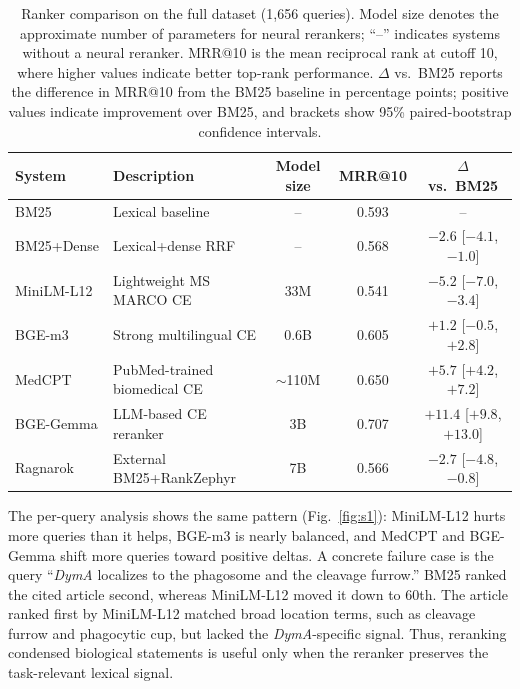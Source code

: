 \documentclass[runningheads]{llncs}
\begin{document}
\begin{table}[!htbp]
\centering
\caption{Ranker comparison on the full dataset (1,656 queries). Model size denotes the approximate number of parameters for neural rerankers; ``--'' indicates systems without a neural reranker. MRR@10 is the mean reciprocal rank at cutoff 10, where higher values indicate better top-rank performance. $\Delta$ vs.\ BM25 reports the difference in MRR@10 from the BM25 baseline in percentage points; positive values indicate improvement over BM25, and brackets show 95\% paired-bootstrap confidence intervals.}
\label{tab:ranker_comparison}
\scriptsize
\setlength{\tabcolsep}{3pt}
\begin{tabular}{@{}llccc@{}}
\toprule
System & Description & Model size & MRR@10 & $\Delta$ vs.\ BM25 \\
\midrule
BM25       & Lexical baseline              & --          & 0.593 & --                       \\
BM25+Dense & Lexical+dense RRF             & --          & 0.568 & $-2.6$ [$-4.1$,$-1.0$]   \\
MiniLM-L12 & Lightweight MS MARCO CE       & 33M         & 0.541 & $-5.2$ [$-7.0$,$-3.4$]   \\
BGE-m3     & Strong multilingual CE        & 0.6B        & 0.605 & $+1.2$ [$-0.5$,$+2.8$]   \\
MedCPT     & PubMed-trained biomedical CE  & $\sim$110M  & 0.650 & $+5.7$ [$+4.2$,$+7.2$]   \\
BGE-Gemma  & LLM-based CE reranker         & 3B          & 0.707 & $+11.4$ [$+9.8$,$+13.0$] \\
Ragnarok   & External BM25+RankZephyr      & 7B          & 0.566 & $-2.7$ [$-4.8$,$-0.8$]   \\
\bottomrule
\end{tabular}
\end{table}
The per-query analysis shows the same pattern (Fig.~\ref{fig:s1}): MiniLM-L12 hurts more
queries than it helps, BGE-m3 is nearly balanced, and MedCPT and BGE-Gemma shift
more queries toward positive deltas. A concrete failure case is the query
``\emph{DymA} localizes to the phagosome and the cleavage furrow.'' BM25 ranked the
cited article second, whereas MiniLM-L12 moved it down to 60th. The article
ranked first by MiniLM-L12 matched broad location terms, such as cleavage furrow
and phagocytic cup, but lacked the \emph{DymA}-specific signal. Thus, reranking condensed
biological statements is useful only when the reranker preserves the task-relevant
lexical signal.
\end{document}
